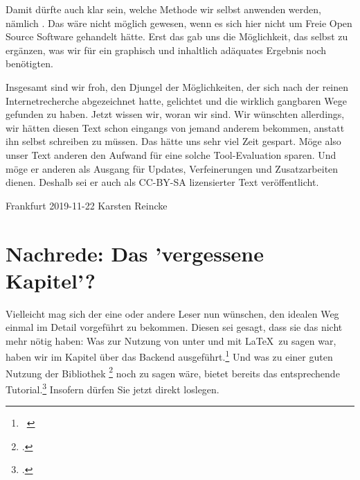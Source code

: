 Damit dürfte auch klar sein, welche Methode wir selbst anwenden werden, nämlich
. Das wäre nicht möglich gewesen, wenn
es sich hier nicht um Freie Open Source Software gehandelt hätte. Erst das gab
uns die Möglichkeit, das selbst zu ergänzen, was wir für ein
graphisch und inhaltlich adäquates Ergebnis noch benötigten.

Insgesamt sind wir froh, den Djungel der Möglichkeiten, der sich nach der reinen
Internetrecherche abgezeichnet hatte, gelichtet und die wirklich gangbaren Wege
gefunden zu haben. Jetzt wissen wir, woran wir sind. Wir wünschten allerdings,
wir hätten diesen Text schon eingangs von jemand anderem bekommen, anstatt ihn
selbst schreiben zu müssen. Das hätte uns sehr viel Zeit gespart. Möge also
unser Text anderen den Aufwand für eine solche Tool-Evaluation sparen. Und möge
er anderen als Ausgang für Updates, Verfeinerungen und Zusatzarbeiten dienen.
Deshalb sei er auch als CC-BY-SA lizensierter Text veröffentlicht.

Frankfurt 2019-11-22 Karsten Reincke

\chapter{Nachrede: Das 'vergessene Kapitel'?}

Vielleicht mag sich der eine oder andere Leser nun wünschen, den idealen Weg
einmal im Detail vorgeführt zu bekommen. Diesen sei gesagt, dass sie das nicht
mehr nötig haben: Was zur Nutzung von  unter und mit \LaTeX\ zu
sagen war, haben wir im Kapitel über das Backend 
ausgeführt.\footnote{\ra\ \pageref{LilyPondBackend}} Und was zu einer guten
Nutzung der Bibliothek \footcite[vgl.][\nopage
wp.]{ReinckeBlum2019a} noch zu sagen wäre, bietet bereits das entsprechende
Tutorial.\footcite[vgl.][]{Reincke2019b} Insofern dürfen Sie jetzt direkt
loslegen.

%
